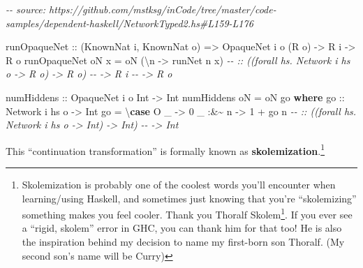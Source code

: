 \documentclass[]{article}
\newenvironment{Shaded}{}{}
\newcommand{\CommentTok}[1]{\textcolor[rgb]{0.38,0.63,0.69}{\textit{#1}}}
\newcommand{\DataTypeTok}[1]{\textcolor[rgb]{0.56,0.13,0.00}{#1}}
\newcommand{\DecValTok}[1]{\textcolor[rgb]{0.25,0.63,0.44}{#1}}
\newcommand{\KeywordTok}[1]{\textcolor[rgb]{0.00,0.44,0.13}{\textbf{#1}}}
\newcommand{\NormalTok}[1]{#1}
\newcommand{\OperatorTok}[1]{\textcolor[rgb]{0.40,0.40,0.40}{#1}}
\newcommand{\OtherTok}[1]{\textcolor[rgb]{0.00,0.44,0.13}{#1}}
\renewcommand{\href}[2]{#2\footnote{\url{#1}}}
\begin{document}
\begin{Shaded}
\begin{Highlighting}[]
\CommentTok{{-}{-} source: https://github.com/mstksg/inCode/tree/master/code{-}samples/dependent{-}haskell/NetworkTyped2.hs\#L159{-}L176}

\OtherTok{runOpaqueNet\textquotesingle{} ::}\NormalTok{ (}\DataTypeTok{KnownNat}\NormalTok{ i, }\DataTypeTok{KnownNat}\NormalTok{ o)}
              \OtherTok{=\textgreater{}} \DataTypeTok{OpaqueNet\textquotesingle{}}\NormalTok{ i o (}\DataTypeTok{R}\NormalTok{ o)}
              \OtherTok{{-}\textgreater{}} \DataTypeTok{R}\NormalTok{ i}
              \OtherTok{{-}\textgreater{}} \DataTypeTok{R}\NormalTok{ o}
\NormalTok{runOpaqueNet\textquotesingle{} oN x }\OtherTok{=}\NormalTok{ oN (\textbackslash{}n }\OtherTok{{-}\textgreater{}}\NormalTok{ runNet n x)}
\CommentTok{{-}{-}            :: ((forall hs. Network i hs o {-}\textgreater{} R o) {-}\textgreater{} R o)}
\CommentTok{{-}{-}            {-}\textgreater{} R i}
\CommentTok{{-}{-}            {-}\textgreater{} R o}

\OtherTok{numHiddens\textquotesingle{} ::} \DataTypeTok{OpaqueNet\textquotesingle{}}\NormalTok{ i o }\DataTypeTok{Int} \OtherTok{{-}\textgreater{}} \DataTypeTok{Int}
\NormalTok{numHiddens\textquotesingle{} oN }\OtherTok{=}\NormalTok{ oN go}
  \KeywordTok{where}
\OtherTok{    go ::} \DataTypeTok{Network}\NormalTok{ i hs o }\OtherTok{{-}\textgreater{}} \DataTypeTok{Int}
\NormalTok{    go }\OtherTok{=}\NormalTok{ \textbackslash{}}\KeywordTok{case}
        \DataTypeTok{O}\NormalTok{ \_      }\OtherTok{{-}\textgreater{}} \DecValTok{0}
\NormalTok{        \_ }\OperatorTok{:\&\textasciitilde{}}\NormalTok{ n\textquotesingle{} }\OtherTok{{-}\textgreater{}} \DecValTok{1} \OperatorTok{+}\NormalTok{ go n\textquotesingle{}}
\CommentTok{{-}{-}          :: ((forall hs. Network i hs o {-}\textgreater{} Int) {-}\textgreater{} Int)}
\CommentTok{{-}{-}          {-}\textgreater{} Int}
\end{Highlighting}
\end{Shaded}

This ``continuation transformation'' is formally known as
\textbf{skolemization}.\footnote{Skolemization is probably one of the coolest
  words you'll encounter when learning/using Haskell, and sometimes just knowing
  that you're ``skolemizing'' something makes you feel cooler. Thank you
  \href{https://en.wikipedia.org/wiki/Thoralf_Skolem}{Thoralf Skolem}. If you
  ever see a ``rigid, skolem'' error in GHC, you can thank him for that too! He
  is also the inspiration behind my decision to name my first-born son Thoralf.
  (My second son's name will be Curry)}
\end{document}

